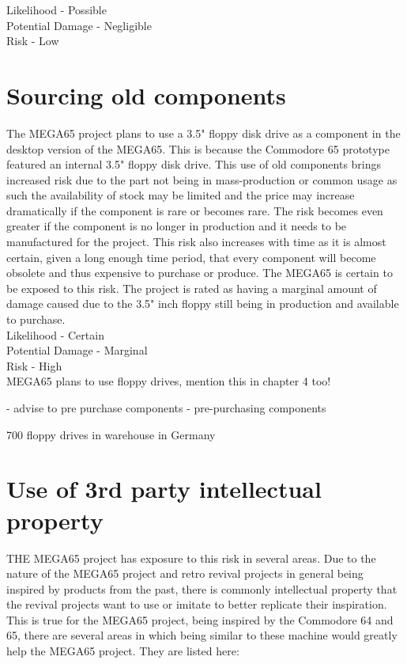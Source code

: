 Likelihood - Possible \\
Potential Damage - Negligible \\
Risk - Low \\


\section{Sourcing old components}
The MEGA65 project plans to use a 3.5" floppy disk drive as a component in the desktop version of the MEGA65. This is because the Commodore 65 prototype featured an internal 3.5" floppy disk drive. This use of old components brings increased risk due to the part not being in mass-production or common usage as such the availability of stock may be limited and the price may increase dramatically if the component is rare or becomes rare. The risk becomes even greater if the component is no longer in production and it needs to be manufactured for the project. This risk also increases with time as it is almost certain, given a long enough time period, that every component will become obsolete and thus expensive to purchase or produce. The MEGA65 is certain to be exposed to this risk. The project is rated as having a marginal amount of damage caused due to the 3.5" inch floppy still being in production and available to purchase. \\

Likelihood - Certain \\
Potential Damage - Marginal \\
Risk - High  \\

MEGA65 plans to use floppy drives, mention this in chapter 4 too!

- advise to pre purchase components 
- pre-purchasing components

700 floppy drives in warehouse in Germany

\section{Use of 3rd party intellectual property}
THE MEGA65 project has exposure to this risk in several areas. Due to the nature of the MEGA65 project and retro revival projects in general being inspired by products from the past, there is commonly intellectual property that the revival projects want to use or imitate to better replicate their inspiration. This is true for the MEGA65 project, being inspired by the Commodore 64 and 65, there are several areas in which being similar to these machine would greatly help the MEGA65 project. They are listed here:

